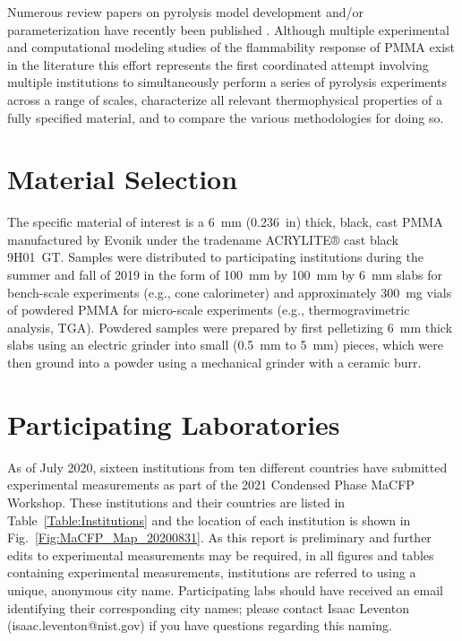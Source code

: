\documentclass{book}
\begin{document}
Numerous review papers on pyrolysis model development and/or parameterization have recently been published \cite{nyazika2019pyrolysis,rogaume2019thermal, stoliarov2016parameterization,matala2012generalized}. Although multiple experimental \cite{kashiwagi1982study, hirata1985thermal, tewarson1992fire, rhodes1996burning} and computational modeling studies of the flammability response of PMMA exist in the literature \cite{consalvi2008numerical, leventon2015flame, fukumoto2018large} this effort represents the first coordinated attempt involving multiple institutions to simultaneously perform a series of pyrolysis experiments across a range of scales, characterize all relevant thermophysical properties of a fully specified material, and to compare the various methodologies for doing so.

\section{Material Selection}

The specific material of interest is a 6~mm (0.236~in) thick, black, cast PMMA manufactured by Evonik under the tradename ACRYLITE® cast black 9H01~GT. Samples were distributed to participating institutions during the summer and fall of 2019 in the form of 100~mm by 100~mm by 6~mm slabs for bench-scale experiments (e.g., cone calorimeter) and approximately 300~mg vials of powdered PMMA for micro-scale experiments (e.g., thermogravimetric analysis, TGA). Powdered samples were prepared by first pelletizing 6~mm thick slabs using an electric grinder into small (0.5~mm to 5~mm) pieces, which were then ground into a powder using a mechanical grinder with a ceramic burr.

\section{Participating Laboratories}

As of July 2020, sixteen institutions from ten different countries have submitted experimental measurements as part of the 2021 Condensed Phase MaCFP Workshop. These institutions and their countries are listed in Table~\ref{Table:Institutions} and the location of each institution is shown in Fig.~\ref{Fig:MaCFP_Map_20200831}. As this report is preliminary and further edits to experimental measurements may be required, in all figures and tables containing experimental measurements, institutions are referred to using a unique, anonymous city name. Participating labs should have received an email identifying their corresponding city names; please contact Isaac Leventon (isaac.leventon@nist.gov) if you have questions regarding this naming.
\end{document}
